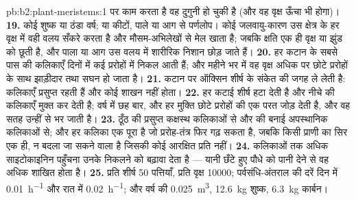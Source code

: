 \begin{solution}{pb:b2:plant-meristems:1}
पर  काम करता है वह दुगुनी हो चुकी है (और वह वृक्ष ऊँचा भी होगा)।
\textbf{19.} कोई शुष्क या ठंडा वर्ष; या कीटों, पाले या आग से पर्णलोप।
कोई जलवायु-कारण उस क्षेत्र के हर वृक्ष में वही वलय सँकरे करता है और
मौसम-अभिलेखों से मेल खाता है; जबकि क्षति एक ही वृक्ष या झुंड को छूती है,
और पाला या आग उस वलय में शारीरिक निशान छोड़ जाते हैं।
\textbf{20.} हर कटान के सबसे पास की कलिकाएँ दिनों में कई प्ररोहों में
निकल आती हैं; और महीने भर में वह वृक्ष अधिक पर छोटे प्ररोहों के साथ
झाड़ीदार तथा सघन हो जाता है।
\textbf{21.} कटान पर ऑक्सिन शीर्ष के संकेत की जगह ले लेती है: कलिकाएँ
प्रसुप्त रहती हैं और कोई शाखन नहीं होता।
\textbf{22.} हर कटाई शीर्ष हटा देती है और नीचे की कलिकाएँ मुक्त कर देती
है; वर्ष में छह बार, और हर मुक्ति छोटे प्ररोहों की एक परत जोड़ देती है,
और वह सतह उन्हीं से भर जाती है।
\textbf{23.} ठूँठ की प्रसुप्त कक्षस्थ कलिकाओं से और  की बनाई
अपस्थानिक कलिकाओं से; और हर कलिका एक पूरा  है जो
प्ररोह-तंत्र फिर गढ़ सकता है, जबकि किसी प्राणी का सिर एक ही, न बदला जा
सकने वाला  है जिसकी कोई आरक्षित प्रति नहीं।
\textbf{24.} कलिकाओं तक अधिक साइटोकाइनिन पहुँचना उनके निकलने को बढ़ावा
देता है --- यानी छँटे हुए पौधे को पानी देने से वह अधिक शाखित होता है।
\textbf{25.} प्रति शीर्ष 50 पत्तियाँ, प्रति वृक्ष \num{10000};
पर्वसंधि-अंतराल की दरें दिन में \qty{0.01}{h^{-1}} और रात में \qty{0.02}{h^{-1}};
और वर्ष की  \qty{0.025}{m^3}, \qty{12.6}{kg} शुष्क, \qty{6.3}{kg} कार्बन।
\end{solution}

